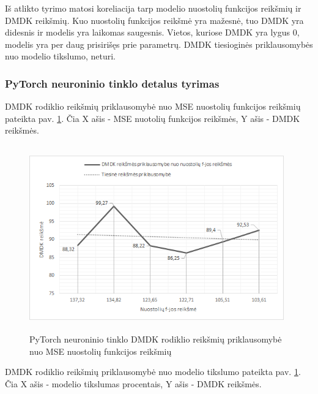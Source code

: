 \documentclass{VUMIFInfBakalaurinis}
\begin{document}
\par Iš atlikto tyrimo matosi koreliacija tarp modelio nuostolių funkcijos reikšmių ir DMDK reikšmių. Kuo nuostolių funkcijos reikšmė yra mažesnė, tuo DMDK yra didesnis ir modelis yra laikomas saugesnis. Vietos, kuriose DMDK yra lygus 0, modelis yra per daug prisirišęs prie parametrų. DMDK tiesioginės priklausomybės nuo modelio tikslumo, neturi.

\subsubsection{PyTorch neuroninio tinklo detalus tyrimas}
\par DMDK rodiklio reikšmių priklausomybė nuo MSE nuostolių funkcijos reikšmių pateikta pav. \ref{fig:PyTorch neuroninio tinklo DMDK rodiklio reikšmių priklausomybė nuo MSE nuostolių funkcijos reikšmių}. Čia X ašis - MSE nuotolių funkcijos reikšmės, Y ašis - DMDK reikšmės. 

\begin{figure}[h]
  \centering
  \includegraphics[width=11cm,height=8cm,keepaspectratio]{img/pap_tyr_1.png}
  \caption{PyTorch neuroninio tinklo DMDK rodiklio reikšmių priklausomybė nuo MSE nuostolių funkcijos reikšmių}
  \label{fig:PyTorch neuroninio tinklo DMDK rodiklio reikšmių priklausomybė nuo MSE nuostolių funkcijos reikšmių}
\end{figure}

\par DMDK rodiklio reikšmių priklausomybė nuo modelio tikslumo pateikta pav. \ref{fig:PyTorch neuroninio tinklo DMDK rodiklio reikšmių priklausomybė nuo MSE nuostolių funkcijos reikšmių}. Čia X ašis - modelio tikslumas procentais, Y ašis - DMDK reikšmės.
\end{document}
